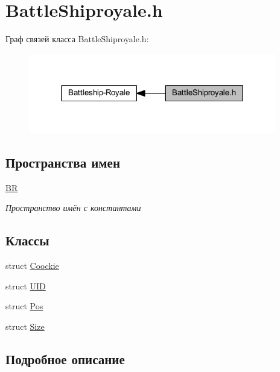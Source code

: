 \hypertarget{group__battleshiproyale}{}\section{Battle\+Shiproyale.\+h}
\label{group__battleshiproyale}
Граф связей класса Battle\+Shiproyale.\+h\+:
\nopagebreak
\begin{figure}[H]
\begin{center}
\leavevmode
\includegraphics[width=305pt]{group__battleshiproyale}
\end{center}
\end{figure}
\subsection*{Пространства имен}
\begin{DoxyCompactItemize}
\item 
 \mbox{\hyperlink{namespace_b_r}{BR}}
\begin{DoxyCompactList}\small\item\em Пространство имён с константами \end{DoxyCompactList}\end{DoxyCompactItemize}
\subsection*{Классы}
\begin{DoxyCompactItemize}
\item 
struct \mbox{\hyperlink{struct_coockie}{Coockie}}
\item 
struct \mbox{\hyperlink{struct_u_i_d}{U\+ID}}
\item 
struct \mbox{\hyperlink{struct_pos}{Pos}}
\item 
struct \mbox{\hyperlink{struct_size}{Size}}
\end{DoxyCompactItemize}


\subsection{Подробное описание}
